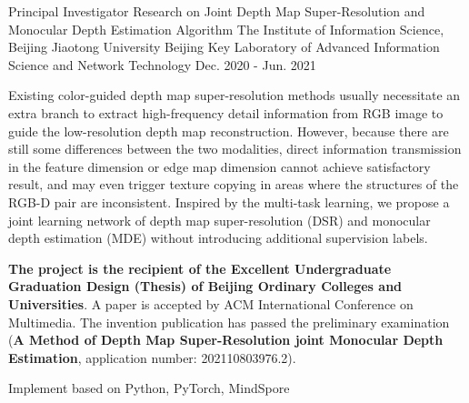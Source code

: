 

\begin{cventries}

    \ecventry
    {Principal Investigator} %
    {Research on Joint Depth Map Super-Resolution \newline and Monocular Depth Estimation Algorithm \href{http://jw.beijing.gov.cn/xxgk/zxxxgk/202111/t20211119_2540974.html}{{\color{awesome}\faLink}}
    } %
    {The Institute of Information Science, Beijing Jiaotong University\newline\vspace{-0.5mm}\hspace{-10mm} Beijing Key Laboratory of Advanced Information Science and Network Technology} %
    {Dec. 2020 - Jun. 2021} %
    {
        \begin{cvitems} %
            \item {Existing color-guided depth map super-resolution methods usually necessitate an extra branch to extract high-frequency detail information from RGB image to guide the low-resolution depth map reconstruction. However, because there are still some differences between the two modalities, direct information transmission in the feature dimension or edge map dimension cannot achieve satisfactory result, and may even trigger texture copying in areas where the structures of the RGB-D pair are inconsistent. Inspired by the multi-task learning, we propose a joint learning network of depth map super-resolution (DSR) and monocular depth estimation (MDE) without introducing additional supervision labels. }
            \item {\textbf{The project is the recipient of the Excellent Undergraduate Graduation Design (Thesis) of Beijing Ordinary Colleges and Universities}. A paper is accepted by ACM International Conference on Multimedia. The invention publication has passed the preliminary examination (\textbf{A Method of Depth Map Super-Resolution joint Monocular Depth Estimation}, application number: 202110803976.2).\href{https://github.com/rmcong/BridgeNet_ACM-MM-2021}{{\color{awesome}\faGithub}}}
            \item {Implement based on Python, PyTorch, MindSpore}
        \end{cvitems}
    }


\end{cventries}
